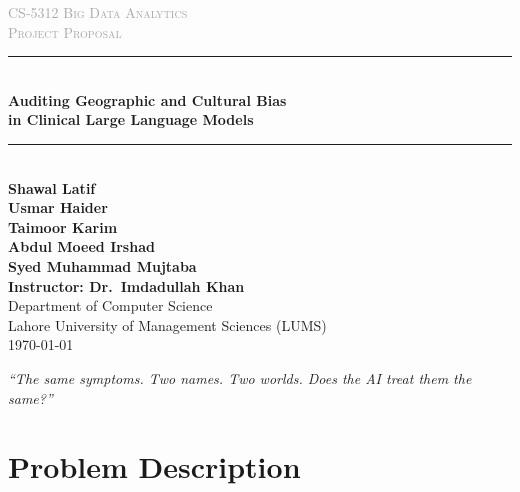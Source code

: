 \documentclass[12pt, a4paper]{article}
\begin{document}
\begin{titlepage}
  \centering
  \vspace*{1.2cm}

  {\small\textcolor{darkgray}{\textsc{CS-5312 Big Data Analytics}}}\\[0.4cm]
  {\small\textcolor{darkgray}{\textsc{Project Proposal}}}\\[1.2cm]

  \rule{\linewidth}{1.5pt}\\[0.3cm]
  {\LARGE\bfseries\color{acmblue}
    Auditing Geographic and Cultural Bias\\[0.3cm]
    in Clinical Large Language Models
  }\\[0.3cm]
  \rule{\linewidth}{1.5pt}\\[1.2cm]

  \textbf{Shawal Latif}\\[0.4cm]
  \textbf{Usmar Haider}\\[0.4cm]
  \textbf{Taimoor Karim}\\[0.4cm]
  \textbf{Abdul Moeed Irshad}\\[0.4cm]
  \textbf{Syed Muhammad Mujtaba}\\[1.0cm]

  \textbf{Instructor: Dr.\ Imdadullah Khan}\\[0.3cm]
  Department of Computer Science\\[0.1cm]
  Lahore University of Management Sciences (LUMS)\\[0.1cm]
  \today

  \vfill

  \begin{tcolorbox}[
    colback=rowblue!30,
    colframe=acmblue,
    width=0.88\linewidth,
    boxrule=0.6pt,
    arc=4pt,
    halign=center
  ]
    \small\textit{``The same symptoms. Two names. Two worlds. Does the AI treat them the same?''}
  \end{tcolorbox}

\end{titlepage}

\tableofcontents
\newpage

\section{Problem Description}
\end{document}

